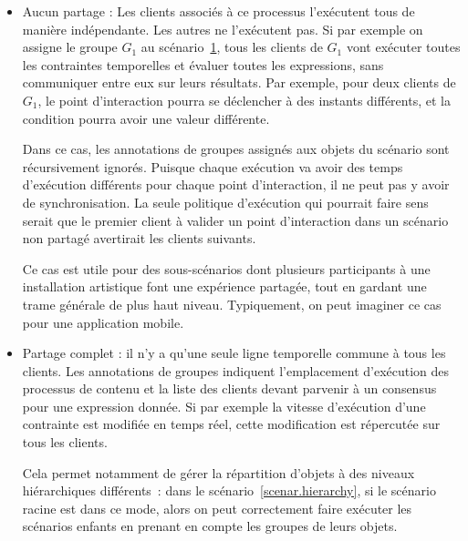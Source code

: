 \documentclass[10pt]{article}
\newcommand\trigger{point d'interaction\xspace}
\begin{document}
\begin{itemize}
    \item Aucun partage : Les clients associés à ce processus l'exécutent tous de manière indépendante.
    Les autres ne l'exécutent pas. 
    Si par exemple on assigne le groupe $G_1$ au scénario~\ref{scenar.general}, tous les clients de $G_1$ vont exécuter toutes les contraintes temporelles et évaluer toutes les expressions, sans communiquer entre eux sur leurs résultats. 
    Par exemple, pour deux clients de $G_1$, le \trigger pourra se déclencher à des instants différents, et la condition pourra avoir une valeur différente.
    
    Dans ce cas, les annotations de groupes assignés aux objets du scénario sont récursivement ignorés. 
    Puisque chaque exécution va avoir des temps d'exécution différents pour chaque point d'interaction, il ne peut pas y avoir de synchronisation.
    La seule politique d'exécution qui pourrait faire sens serait que le premier client à valider un \trigger dans un scénario non partagé avertirait les clients suivants.
    
    Ce cas est utile pour des sous-scénarios dont plusieurs participants à une installation artistique font une expérience partagée, tout en gardant une trame générale de plus haut niveau. 
    Typiquement, on peut imaginer ce cas pour une application mobile.
    
    \begin{figure}[h]
        \centering
        \begin{tikzpicture}
        
        \end{tikzpicture}
        \label{scenar.general}
    \end{figure}
    
    \item Partage complet : il n'y a qu'une seule ligne temporelle commune à tous les clients. 
    Les annotations de groupes indiquent l'emplacement d'exécution des processus de contenu et la liste des clients devant parvenir à un consensus pour une expression donnée. 
    Si par exemple la vitesse d'exécution d'une contrainte est modifiée en temps réel, cette modification est répercutée sur tous les clients.
    
    Cela permet notamment de gérer la répartition d'objets à des niveaux hiérarchiques différents~: dans le scénario~\ref{scenar.hierarchy}, si le scénario racine est dans ce mode, alors on peut correctement faire exécuter les scénarios enfants en prenant en compte les groupes de leurs objets. 
    

\end{itemize}
\end{document}
